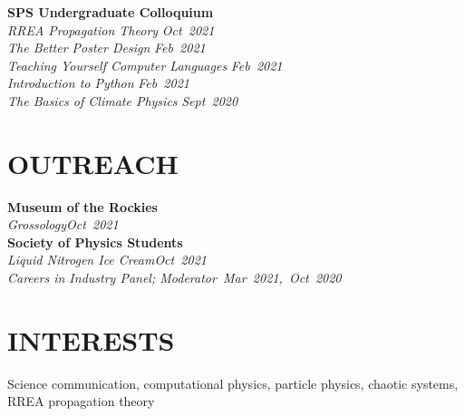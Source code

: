 \documentclass[margin]{res}
\begin{document}
\begin{resume}
\textbf{SPS Undergraduate Colloquium}\\
\hspace{3ex} {\sl RREA Propagation Theory} \hfill {\sl Oct~2021}\\\vspace{0.5ex}
\hspace{3ex} {\sl The Better Poster Design} \hfill {\sl Feb~2021}\\\vspace{0.5ex}
\hspace{3ex} {\sl Teaching Yourself Computer Languages} \hfill {\sl Feb~2021}\\\vspace{0.5ex}
\hspace{3ex} {\sl Introduction to Python} \hfill {\sl Feb~2021}\\\vspace{0.5ex}
\hspace{3ex} {\sl The Basics of Climate Physics} \hfill {\sl Sept~2020}\\

	
\section{OUTREACH}
\textbf{Museum of the Rockies}\\
\hspace{3ex} {\sl Grossology}\hfill {\sl Oct~2021}\\\vspace{0.5ex}
\textbf{Society of Physics Students}\\
\hspace{3ex} {\sl Liquid Nitrogen Ice Cream}\hfill {\sl Oct~2021}\\\vspace{0.5ex}
\hspace{3ex} {\sl Careers in Industry Panel; Moderator}\hfill {\sl ~Mar~2021,~Oct~2020}\\


\section{INTERESTS}
Science communication, computational physics, particle physics, chaotic systems, RREA propagation theory

\end{resume}
\end{document}
